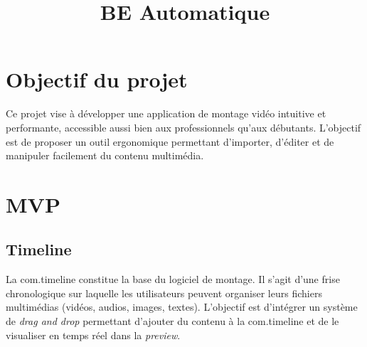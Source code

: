 \documentclass{rapport}
\title{BE Automatique} %
\begin{document}

\subject{Fonctionnalités du logiciel de montage} %



        
\buildmargins %
\buildcover %
\toc %

\section{Objectif du projet}
Ce projet vise à développer une application de montage vidéo intuitive et performante, accessible aussi bien aux professionnels qu'aux débutants. L'objectif est de proposer un outil ergonomique permettant d'importer, d'éditer et de manipuler facilement du contenu multimédia.

\section{MVP}

\subsection{Timeline}
La com.timeline constitue la base du logiciel de montage. Il s'agit d'une frise chronologique sur laquelle les utilisateurs peuvent organiser leurs fichiers multimédias (vidéos, audios, images, textes). L’objectif est d’intégrer un système de \textit{drag and drop} permettant d’ajouter du contenu à la com.timeline et de le visualiser en temps réel dans la \textit{preview}.
\end{document}
